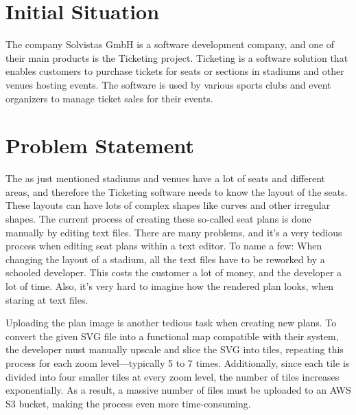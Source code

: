 \section{Initial Situation}
The company Solvistas GmbH is a software development company, and one of their main products is the Ticketing project. Ticketing is a software solution that enables customers to purchase tickets for seats or sections in stadiums and other venues hosting events. The software is used by various sports clubs and event organizers to manage ticket sales for their events.


\section{Problem Statement}
The as just mentioned stadiums and venues have a lot of seats and different areas, and therefore the Ticketing software needs to know the layout of the seats. These layouts can have lots of complex shapes like curves and other irregular shapes. The current process of creating these so-called seat plans is done manually by editing text files. There are many problems, and it's a very tedious process when editing seat plans within a text editor. To name a few: When changing the layout of a stadium, all the text files have to be reworked by a schooled developer. This costs the customer a lot of money, and the developer a lot of time. Also, it's very hard to imagine how the rendered plan looks, when staring at text files.

Uploading the plan image is another tedious task when creating new plans. To convert the given SVG file into a functional map compatible with their system, the developer must manually upscale and slice the SVG into tiles, repeating this process for each zoom level—typically 5 to 7 times. Additionally, since each tile is divided into four smaller tiles at every zoom level, the number of tiles increases exponentially. As a result, a massive number of files must be uploaded to an AWS S3 bucket, making the process even more time-consuming.


